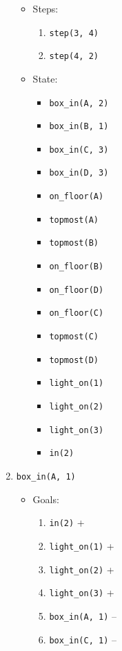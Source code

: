 \documentclass[12pt]{article}
\begin{document}
\begin{enumerate}
\begin{itemize}
\begin{enumerate}
        \end{enumerate}
      \item Steps:
        \begin{enumerate}
          \item \texttt{step(3, 4)}
          \item \texttt{step(4, 2)}
        \end{enumerate}
      \item State:
        \begin{itemize}
          \item \texttt{box\_in(A, 2)}
          \item \texttt{box\_in(B, 1)}
          \item \texttt{box\_in(C, 3)}
          \item \texttt{box\_in(D, 3)}
          \item \texttt{on\_floor(A)}
          \item \texttt{topmost(A)}
          \item \texttt{topmost(B)}
          \item \texttt{on\_floor(B)}
          \item \texttt{on\_floor(D)}
          \item \texttt{on\_floor(C)}
          \item \texttt{topmost(C)}
          \item \texttt{topmost(D)}
          \item \texttt{light\_on(1)}
          \item \texttt{light\_on(2)}
          \item \texttt{light\_on(3)}
          \item \texttt{in(2)}
        \end{itemize}
    \end{itemize}
  \item \texttt{box\_in(A, 1)}
    \begin{itemize}
      \item Goals:
        \begin{enumerate}
          \item \texttt{in(2)} +
          \item \texttt{light\_on(1)} +
          \item \texttt{light\_on(2)} +
          \item \texttt{light\_on(3)} +
          \item \texttt{box\_in(A, 1)} --
          \item \texttt{box\_in(C, 1)} --

\end{enumerate}
\end{itemize}
\end{enumerate}
\end{document}
